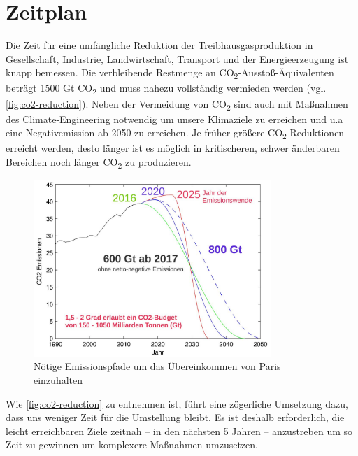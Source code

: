 \section{Zeitplan}

Die Zeit für eine umfängliche Reduktion der Treibhausgasproduktion in Gesellschaft, Industrie, Landwirtschaft, Transport und der Energieerzeugung ist knapp bemessen.
Die verbleibende Restmenge an CO\textsubscript{2}-Ausstoß-Äquivalenten beträgt 1500 Gt CO\textsubscript{2} und muss nahezu vollständig vermieden werden (vgl. \autoref{fig:co2-reduction}).
Neben der Vermeidung von CO\textsubscript{2} sind auch mit Maßnahmen des Climate-Engineering notwendig um unsere Klimaziele zu erreichen und u.a eine Negativemission ab 2050 zu erreichen.
Je früher größere CO\textsubscript{2}-Reduktionen erreicht werden, desto länger ist es möglich in kritischeren, schwer änderbaren Bereichen noch länger CO\textsubscript{2} zu produzieren.

\begin{figure}[!htb]
	\centering
	\includegraphics[width=0.8\textwidth]{emission-paths-for-reaching-the-paris-agreement.jpg}
	\caption{Nötige Emissionspfade um das Übereinkommen von Paris einzuhalten}
	\label{fig:co2-reduction}
\end{figure}

Wie \autoref{fig:co2-reduction} zu entnehmen ist, führt eine zögerliche Umsetzung dazu, dass uns weniger Zeit für die Umstellung bleibt.
Es ist deshalb erforderlich, die leicht erreichbaren Ziele zeitnah -- in den nächsten 5 Jahren -- anzustreben um so Zeit zu gewinnen um komplexere Maßnahmen umzusetzen.






